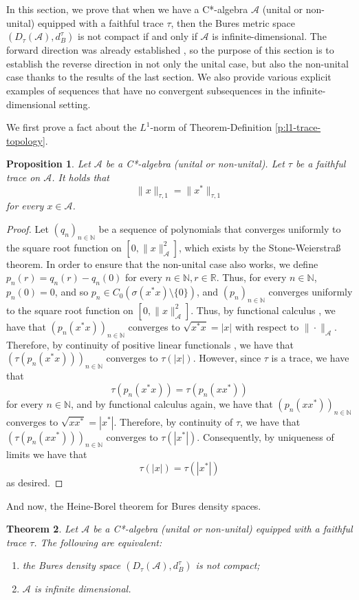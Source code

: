 \documentclass{amsart}
\theoremstyle{plain}
\newtheorem{theorem}{Theorem}[section]
\newtheorem{proposition}[theorem]{Proposition}
\theoremstyle{definition}
\theoremstyle{remark}
\numberwithin{equation}{section}
\newcommand{\A}{{\mathcal{A}}}
\newcommand{\N}{{\mathds{N}}}
\newcommand{\R}{{\mathds{R}}}
\begin{document}
In this section, we prove that when we have a C*-algebra $\A$ (unital or non-unital) equipped with a faithful trace $\tau$, then the Bures metric space $(D_\tau(\A), d_B^\tau)$ is not compact if and only if $\A$ is infinite-dimensional. The forward  direction was already established \cite[Proposition 3.3 and Theorem 3.5]{Aguilar25}, so the purpose of this section is to establish the reverse direction in not only the unital case, but also the non-unital case thanks to the results of the last section. We also provide various explicit examples of sequences that have no convergent subsequences in the infinite-dimensional setting. 


We first prove a fact about the $L^1$-norm of Theorem-Definition \ref{p:l1-trace-topology}.


\begin{proposition}\label{p:l1-star-invariant}
    Let $\A$ be a C*-algebra (unital or non-unital). Let $\tau$ be a faithful trace on $\A$. It holds that 
    \[
    \|x\|_{\tau,1}=\|x^*\|_{\tau,1}
    \]
    for every $x\in \A$.
\end{proposition}
\begin{proof}
Let $(q_n)_{n\in \N}$ be a sequence of polynomials  that converges uniformly to the square root function on $[0,\|x\|^2_\A]$, which exists by the  Stone-Weierstra\ss{}  theorem. In order to ensure that the non-unital case also works, we define $p_n(r)=q_n(r)-q_n(0)$ for every $n\in \N, r\in \R$. Thus, for every $n\in \N$,  $p_n(0)=0$,  and so $p_n\in C_0(\sigma(x^*x)\setminus \{0\})$, and $(p_n)_{n\in \N}$ converges uniformly to the square root function on $[0,\|x\|^2_\A]$. Thus, by functional calculus \cite[Corollary I.3.2]{Davidson}, we have that $(p_n(x^*x))_{n\in \N}$ converges to $\sqrt{x^*x}=|x|$ with respect to $\|\cdot\|_\A$. Therefore, by continuity of positive linear functionals \cite[Lemma I.9.5]{Davidson}, we have that $(\tau(p_n(x^*x)))_{n\in \N}$ converges to $\tau(|x|). $ However, since $\tau$ is a trace, we have that 
\[
\tau(p_n(x^*x))=\tau(p_n(xx^*))
\]
for every $n\in \N$, and by functional calculus again, we have that $(p_n(xx^*))_{n\in \N}$ converges to $\sqrt{xx^*}=|x^*|$. Therefore, by continuity of $\tau$, we have that $(\tau(p_n(xx^*)))_{n\in \N}$ converges to $\tau(|x^*|)$. Consequently, by uniqueness of limits we have that
\[
\tau(|x|)=\tau(|x^*|)
\]
as desired.
\end{proof}
And now, the Heine-Borel theorem for Bures density spaces.
\begin{theorem}\label{t:hb-bures}
    Let $\A$ be a C*-algebra (unital or non-unital) equipped with a faithful trace $\tau$. The following are equivalent:
    \begin{enumerate}
        \item the Bures density space $(D_\tau(\A), d_B^\tau)$ is not compact;
        \item $\A$ is infinite dimensional.
    \end{enumerate}
\end{theorem}
\end{document}
